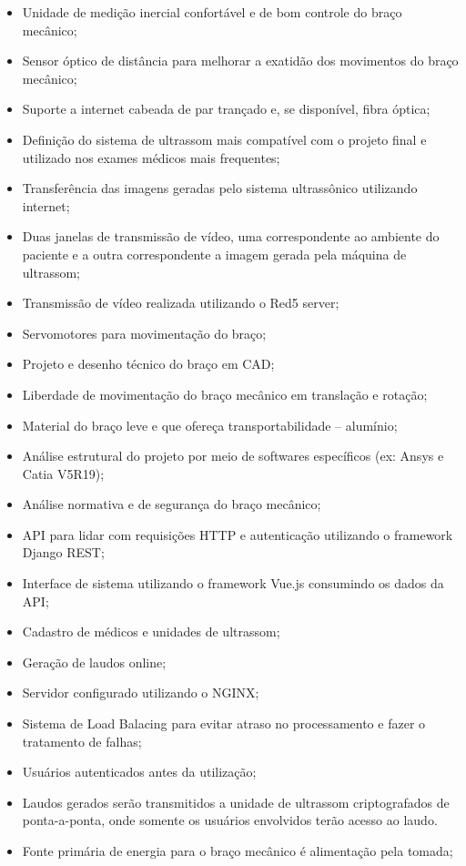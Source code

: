 \begin{itemize}
\item Unidade de medição inercial confortável e de bom controle do braço mecânico;
\item Sensor óptico de distância para melhorar a exatidão dos movimentos do braço mecânico;
\item Suporte a internet cabeada de par trançado e, se disponível, fibra óptica;
\item Definição do sistema de ultrassom mais compatível com o projeto final e utilizado nos exames médicos mais frequentes;
\item Transferência das imagens geradas pelo sistema ultrassônico utilizando internet;
\item Duas janelas de transmissão de vídeo, uma correspondente ao ambiente do paciente e a outra correspondente a imagem gerada pela máquina de ultrassom;
\item Transmissão de vídeo realizada utilizando o Red5 server;
\item Servomotores para movimentação do braço;
\item Projeto e desenho técnico do braço em CAD;
\item Liberdade de movimentação do braço mecânico em translação e rotação;
\item Material do braço leve e que ofereça transportabilidade – alumínio;
\item Análise estrutural do projeto por meio de softwares específicos (ex: Ansys e Catia V5R19);
\item Análise normativa e de segurança do braço mecânico;
\item API para lidar com requisições HTTP e autenticação utilizando o framework Django REST;
\item Interface de sistema utilizando o framework Vue.js consumindo os dados da API;
\item Cadastro de médicos e unidades de ultrassom;
\item Geração de laudos online;
\item Servidor configurado utilizando o NGINX;
\item Sistema de Load Balacing para evitar atraso no processamento e fazer o tratamento de falhas;
\item Usuários autenticados antes da utilização;
\item Laudos gerados serão transmitidos a unidade de ultrassom criptografados de ponta-a-ponta, onde somente os usuários envolvidos terão acesso ao laudo.
\item Fonte primária de energia para o braço mecânico é alimentação pela tomada;

\end{itemize}
